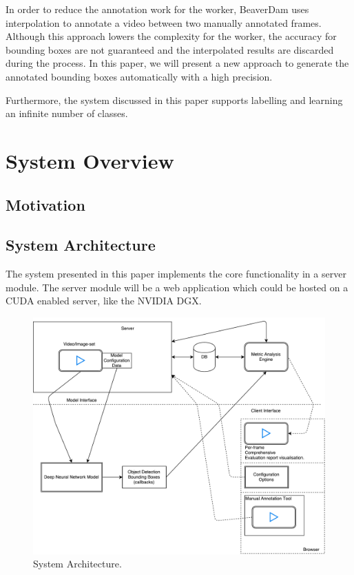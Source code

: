 \documentclass[conference]{IEEEtran}
\newcommand{\figwidthb}{0.80\linewidth}
\begin{document}
In order to reduce the annotation work for the worker, BeaverDam uses interpolation to annotate a video between two manually annotated frames. Although this approach lowers the complexity for the worker, the accuracy for bounding boxes are not guaranteed and the interpolated results are discarded during the process. In this paper, we will present a new approach to generate the annotated bounding boxes automatically with a high precision.\par
Furthermore, the system discussed in this paper supports labelling and learning an infinite number of classes.  \par

\section{System Overview}\label{sec.overview}

\subsection{Motivation}

\subsection{System Architecture}
The system presented in this paper implements the core functionality in a server module. The server module will be a web application which could be hosted on a CUDA enabled server, like the NVIDIA DGX.

\begin{figure}[htb]
\centering
\includegraphics[width=\figwidthb]{fig/system_architecture.pdf}
\caption{System Architecture.} \label{fig.structure}
\end{figure}
\end{document}
